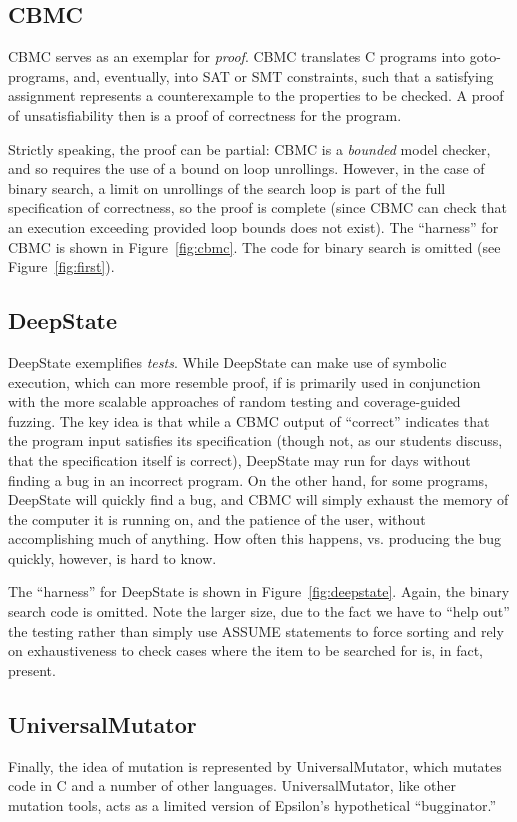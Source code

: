 \documentclass[sigplan]{acmart}
\begin{document}
\subsection{CBMC}


CBMC serves as an exemplar for \emph{proof}.  CBMC
translates C programs into goto-programs, and, eventually, into SAT or
SMT constraints, such that a satisfying assignment represents a
counterexample to the properties to be checked.  A proof of
unsatisfiability then is a proof of correctness for the program.

Strictly speaking, the
proof can be partial: CBMC is a \emph{bounded} model checker, and so
requires the use of a bound on loop unrollings.  However, in the case
of binary search, a limit on unrollings of the search loop is part of
the full specification of correctness, so the proof is complete (since
CBMC can check that an execution exceeding provided loop bounds does
not exist).  The ``harness'' for CBMC is shown in
Figure~\ref{fig:cbmc}.  The code for binary search is omitted (see
Figure~\ref{fig:first}).


\subsection{DeepState}

DeepState exemplifies \emph{tests}.  While DeepState can make use of
symbolic execution, which can more resemble proof, if is primarily
used in conjunction with the more scalable approaches of random
testing and coverage-guided fuzzing.  The key idea is that while a
CBMC output of ``correct'' indicates that the program input satisfies
its specification (though not, as our students discuss, that the
specification itself is correct), DeepState may run for days without
finding a bug in an incorrect program.  On the other hand, for some
programs, DeepState will quickly find a bug, and CBMC will simply
exhaust the memory of the computer it is running on, and the patience
of the user, without accomplishing much of anything.  How often this
happens, vs. producing the bug quickly, however, is hard to know.

The ``harness'' for DeepState is shown in Figure~\ref{fig:deepstate}.
Again, the binary search code is omitted.  Note the larger size, due to the fact we
have to ``help out'' the testing rather than simply use ASSUME
statements to force sorting and rely on exhaustiveness to check cases
where the item to be searched for is, in fact, present.

\subsection{UniversalMutator}

Finally, the idea of mutation is represented by UniversalMutator, which mutates code
in C and a number of other languages.  UniversalMutator, like other
mutation tools, acts as a limited version of Epsilon's hypothetical
``bugginator.''




\end{document}

